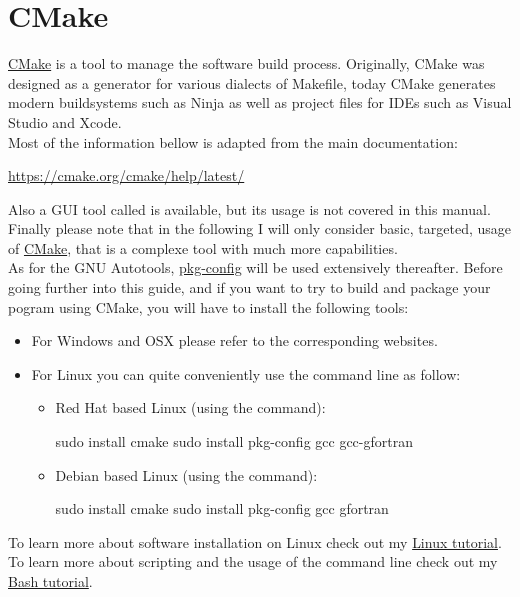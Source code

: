 \section{CMake}

\href{https://cmake.org}{CMake} is a tool to manage the software build process. 
Originally, CMake was designed as a generator for various dialects of Makefile, today CMake generates modern buildsystems such as Ninja as well as project files for IDEs such as Visual Studio and Xcode. \\
Most of the information bellow is adapted from the main documentation: 
\begin{center}\href{https://cmake.org/cmake/help/latest/}{https://cmake.org/cmake/help/latest/} \end{center}
Also a GUI tool called  is available, but its usage is not covered in this manual. \\
Finally please note that in the following I will only consider basic, targeted, usage of \href{https://cmake.org}{CMake}, that is a complexe tool with much more capabilities. \\[0.25cm]
As for the GNU Autotools, \href{https://en.wikipedia.org/wiki/Pkg-config}{pkg-config} will be used extensively thereafter.  
Before going further into this guide, and if you want to try to build and package your pogram using CMake, you will have to install the following tools: 
\begin{itemize}
\item For Windows and OSX please refer to the corresponding websites.
\item For Linux you can quite conveniently use the command line as follow:
\begin{itemize}
\item Red Hat based Linux (using the  command):
\begin{scriptii}
\fprompt{~} sudo  install cmake
\fprompt{~} sudo  install pkg-config gcc gcc-gfortran
\end{scriptii}
\item Debian based Linux (using the  command):
\begin{scriptii}
\uprompt{~} sudo  install cmake
\uprompt{~} sudo  install pkg-config gcc gfortran
\end{scriptii}
\end{itemize}
\end{itemize}
To learn more about software installation on Linux check out my \href{https://www.ipcms.fr/wp-content/uploads/2021/11/linux.pdf}{Linux tutorial}. \\
To learn more about scripting and the usage of the command line check out my \href{https://www.ipcms.fr/wp-content/uploads/2021/05/bash.pdf}{Bash tutorial}. 

